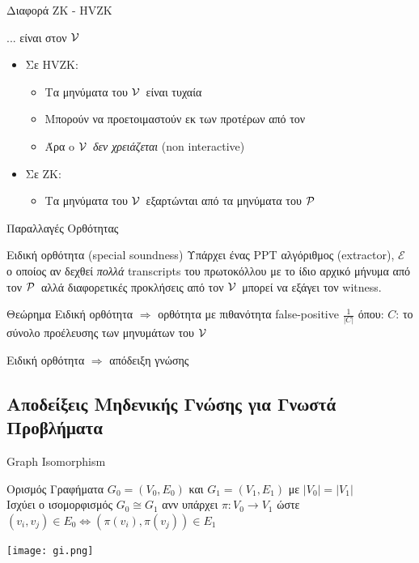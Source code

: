 \documentclass[10pt,handout]{beamer}
\begin{document}
\begin{frame}{Διαφορά ZK - HVZK}
    \begin{block}{... είναι στον $\mathcal{V}\,$}
    \begin{itemize}
        \item Σε HVZK:
        \begin{itemize}
            \item Τα μηνύματα του $\mathcal{V}\,$ είναι τυχαία 
            \item Μπορούν να προετοιμαστούν εκ των προτέρων  από τον \siml
            \item Άρα o $\mathcal{V}\,$ \emph{δεν χρειάζεται} (non interactive)
        \end{itemize} 
        \item Σε ZK:
        \begin{itemize}
            \item Τα μηνύματα του $\mathcal{V}\,$ εξαρτώνται από τα μηνύματα του $\mathcal{P}\,$
        \end{itemize}
    \end{itemize}    
    \end{block}
\end{frame}

\begin{frame}{Παραλλαγές Ορθότητας}
\begin{block}{Ειδική ορθότητα (special soundness)}
Υπάρχει ένας PPT αλγόριθμος (extractor), $\mathcal{E}$ ο οποίος αν δεχθεί \emph{πολλά} transcripts του πρωτοκόλλου με το ίδιο αρχικό μήνυμα από τον $\mathcal{P}\,$ αλλά διαφορετικές προκλήσεις από τον $\mathcal{V}\,$ μπορεί να εξάγει τον witness.
\end{block}
\pause
\begin{block}{Θεώρημα}
Ειδική ορθότητα $\Rightarrow$ ορθότητα με πιθανότητα false-positive $\frac{1}{|C|}$ όπου:
$C$: το σύνολο προέλευσης των μηνυμάτων του $\mathcal{V}\,$

Ειδική ορθότητα $\Rightarrow$ απόδειξη γνώσης
\end{block}
\end{frame}

\subsection{Αποδείξεις Μηδενικής Γνώσης για Γνωστά Προβλήματα}
\begin{frame}{Graph Isomorphism}
	\begin{block}{Ορισμός}
		Γραφήματα $G_0=(V_0,E_0)$ και $G_1=(V_1,E_1)$ με $|V_0| = |V_1|$ \\ \pause
		Ισχύει ο ισομορφισμός $G_0 \cong G_1$ ανν   
		υπάρχει $\pi :V_0 \rightarrow V_1 $ ώστε $(v_i,v_j) \in E_0 \Leftrightarrow (\pi(v_i),\pi(v_j)) \in E_1$ \pause 
\end{block}
\begin{center}
	\texttt{[image: gi.png]}
\end{center}
\end{frame}
\end{document}
